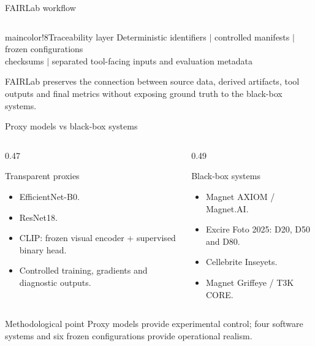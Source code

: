 \documentclass{beamer}
\begin{document}
\begin{frame}{FAIRLab workflow}
\begin{columns}[c,onlytextwidth]
\end{columns}

\vspace{0.55cm}

\begin{colorblock}[black]{maincolor!8}{Traceability layer}
\centering
\small
Deterministic identifiers \quad $\vert$ \quad controlled manifests \quad $\vert$ \quad frozen configurations\\[0.12cm]
checksums \quad $\vert$ \quad separated tool-facing inputs and evaluation metadata
\end{colorblock}

\vspace{0.18cm}

\centering
\scriptsize
FAIRLab preserves the connection between source data, derived artifacts, tool outputs and final metrics without exposing ground truth to the black-box systems.
\end{frame}

\begin{frame}{Proxy models vs black-box systems}
\begin{columns}
\begin{column}{0.47\textwidth}
\begin{block}{Transparent proxies}
\begin{itemize}
    \item EfficientNet-B0.
    \item ResNet18.
    \item CLIP: frozen visual encoder + supervised binary head.
    \item Controlled training, gradients and diagnostic outputs.
\end{itemize}
\end{block}
\end{column}
\begin{column}{0.49\textwidth}
\begin{block}{Black-box systems}
\begin{itemize}
    \item Magnet AXIOM / Magnet.AI.
    \item Excire Foto 2025: D20, D50 and D80.
    \item Cellebrite Inseyets.
    \item Magnet Griffeye / T3K CORE.
\end{itemize}
\end{block}
\end{column}
\end{columns}

\begin{block}{Methodological point}
Proxy models provide experimental control; four software systems and six frozen configurations provide operational realism.
\end{block}
\end{frame}
\end{document}

